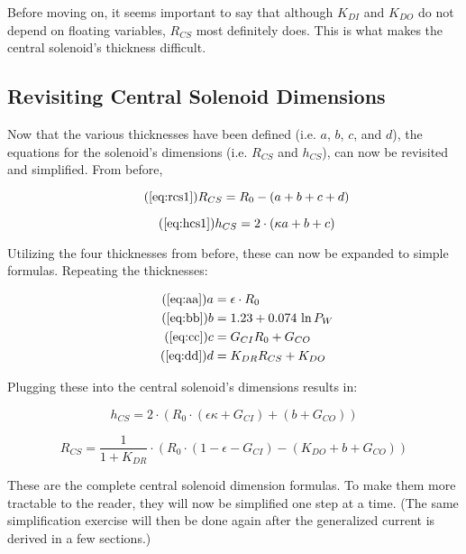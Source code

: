 Before moving on, it seems important to say that although $K_{DI}$ and $K_{DO}$ do not depend on floating variables, $R_{CS}$ most definitely does. This is what makes the central solenoid's thickness difficult.

\subsection{Revisiting Central Solenoid Dimensions}

Now that the various thicknesses have been defined (i.e. $a$, $b$, $c$, and $d$), the equations for the solenoid's dimensions (i.e. $R_{CS}$ and $h_{CS}$), can now be revisited and simplified. From before,

 \begin{equation}
 	\tag{\ref{eq:rcs1}}
 	R_{CS} = R_0 - ( a + b + c + d )
 \end{equation}
 
 \begin{equation}
	\tag{\ref{eq:hcs1}}
 	h_{CS} = 2 \cdot \left ( \kappa a + b + c \right)
 \end{equation}

Utilizing the four thicknesses from before, these can now be expanded to simple formulas. Repeating the thicknesses:

\begin{align}
	\tag{\ref{eq:aa}}
	a &= \epsilon \cdot R_0 \\
	\tag{\ref{eq:bb}}
	b &= 1.23 + 0.074 \ \textnormal{ln} \, P_W \\
	\tag{\ref{eq:cc}}
	c &= G_{CI} R_0 + G_{CO} \\
 	\tag{\ref{eq:dd}}
	d &= K_{DR} R_{CS} + K_{DO} 
\end{align}

Plugging these into the central solenoid's dimensions results in:

\begin{equation}
	h_{CS} = 2 \cdot \left( R_0 \cdot \left( \epsilon \kappa + G_{CI} \right) + \left( b + G_{CO} \right) \right)
\end{equation}

\begin{equation}
	R_{CS} = \frac{ 1 }{ 1 + K_{DR} } \cdot \left( R_0 \cdot \left( 1 - \epsilon - G_{CI}  \right) - \left( K_{DO} + b + G_{CO}  \right) \right)
\end{equation}

These are the complete central solenoid dimension formulas. To make them more tractable to the reader, they will now be simplified one step at a time. (The same simplification exercise will then be done again after the generalized current is derived in a few sections.)

